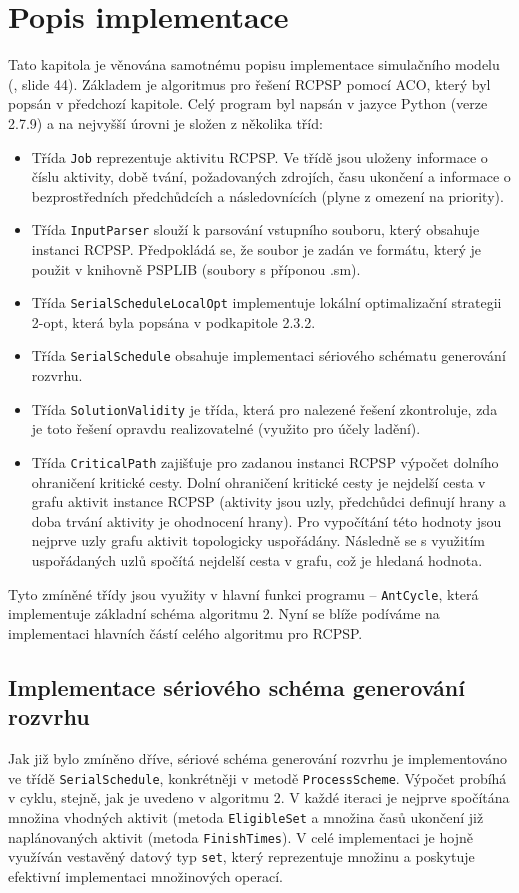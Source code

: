 \documentclass[a4paper,12pt]{article}
\begin{document}
\section{Popis implementace}
Tato kapitola je věnována samotnému popisu implementace simulačního modelu (\cite{peringer}, slide 44). Základem je algoritmus pro řešení RCPSP pomocí
ACO, který byl popsán v předchozí kapitole. Celý program byl napsán v jazyce Python (verze 2.7.9) a 
na nejvyšší úrovni je složen z několika tříd:
\begin{itemize}
 \item Třída \texttt{Job} reprezentuje aktivitu RCPSP. Ve třídě jsou uloženy informace
  o číslu aktivity, době tvání, požadovaných zdrojích, času ukončení a informace
  o bezprostředních předchůdcích a následovnících (plyne z omezení na priority).
 \item Třída \texttt{InputParser} slouží k parsování vstupního souboru, který obsahuje
  instanci RCPSP. Předpokládá se, že soubor je zadán ve formátu, který je 
  použit v knihovně PSPLIB (soubory s příponou .sm).
 \item Třída \texttt{SerialScheduleLocalOpt} implementuje lokální optimalizační strategii
  2-opt, která byla popsána v podkapitole 2.3.2.
 \item Třída \texttt{SerialSchedule} obsahuje implementaci sériového schématu generování
 rozvrhu.
 \item Třída \texttt{SolutionValidity} je třída, která pro nalezené řešení zkontroluje, zda
  je toto řešení opravdu realizovatelné (využito pro účely ladění).
 \item Třída \texttt{CriticalPath} zajišťuje pro zadanou instanci RCPSP výpočet dolního ohraničení kritické cesty.
  Dolní ohraničení kritické cesty je nejdelší cesta v grafu aktivit instance RCPSP (aktivity jsou uzly, 
  předchůdci definují hrany a doba trvání aktivity je ohodnocení hrany). 
  Pro vypočítání této hodnoty jsou nejprve uzly grafu aktivit topologicky uspořádány.
  Následně se s využitím uspořádaných uzlů spočítá nejdelší cesta v grafu, což je hledaná
  hodnota.
\end{itemize}
Tyto zmíněné třídy jsou využity v hlavní funkci programu -- \texttt{AntCycle}, která 
implementuje základní schéma algoritmu 2. Nyní se blíže podíváme na implementaci 
hlavních částí celého algoritmu pro RCPSP.

\subsection{Implementace sériového schéma generování rozvrhu}
Jak již bylo zmíněno dříve, sériové schéma generování rozvrhu je implementováno
ve třídě \texttt{SerialSchedule}, konkrétněji v metodě \texttt{ProcessScheme}. Výpočet probíhá v cyklu, stejně, jak je uvedeno
v algoritmu 2. V každé iteraci je nejprve spočítána množina vhodných aktivit (metoda \texttt{EligibleSet} a množina časů ukončení
již naplánovaných aktivit (metoda \texttt{FinishTimes}). V celé implementaci je hojně
využíván vestavěný datový typ \texttt{set}, který reprezentuje množinu a poskytuje efektivní implementaci
množinových operací. 
\end{document}
